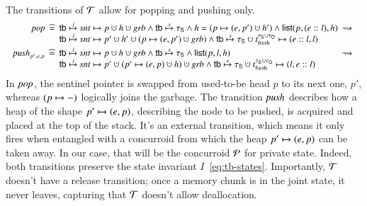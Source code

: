 The transitions of $\mathcal{T}$ allow for popping and pushing only. 
%
\[ 
{ 
\small
\hspace{-3pt}
  \begin{array}{r@{\ }c@{\ }l@{\ \ }c}
    \taupop & \eqdef &\htb \jpts \sent \hpts p \hunion h \hunion
    \garb \aand \htb \spts \histS  \aand h = (p \hpts (e, p')\hunion h') \aand \llist(p, (e::l), h) &
    \rightsquigarrow 
    \\
    & &\htb \jpts \sent \hpts p' \hunion h' \hunion (p \hpts (e,
    p') \hunion \garb) \aand \htb \spts \histS \hunion \tfr{\histS \hunion \histO} \hpts
    (e::l, l) 
    \\[3pt]
    \alphapush_{p', e, p} & \eqdef &\htb \jpts \sent \hpts p \hunion h \hunion
    \garb \aand \htb \spts \histS \aand \llist(p, l, h) &  \rightsquigarrow 
    \\
    & & \htb \jpts \sent \hpts p' \hunion (p' \hpts (e, p) \hunion h) \hunion
    \garb \aand \htb \spts \histS \hunion \tfr{\histS \hunion \histO} \hpts
    (l, e::l) 
    \end{array}
}\]
%
In ${\mathit{pop}}$, the sentinel pointer is swapped from used-to-be head $p$
to its next one, $p'$, whereas $(p \mapsto -)$ logically joins the
garbage. The transition ${\mathit{push}}$ describes how a heap of the shape
$p' \mapsto (e, p)$, describing the node to be pushed, is acquired and
placed at the top of the stack. It's an external transition, which
means it only fires when entangled with a concurroid from which the
heap $p' \mapsto (e, p)$ can be taken away. In our case, that will be
the concurroid $\mathcal{P}$ for private state. 
%
Indeed, both transitions preserve the state invariant
$I$~\eqref{eq:tb-states}.
%
Importantly, $\mathcal{T}$ doesn't have a release transition; once a memory
chunk is in the joint state, it never leaves, capturing that $\mathcal{T}$
doesn't allow deallocation.
%


